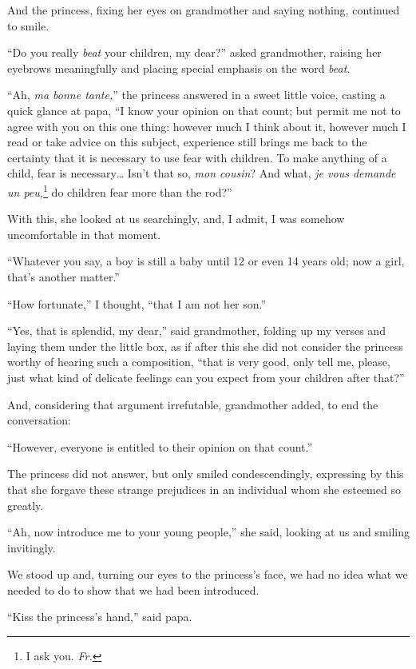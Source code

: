 And the princess, fixing her eyes on grandmother and saying nothing, continued to smile.

``Do you really \textit{beat} your children, my dear?'' asked grandmother, raising her eyebrows meaningfully and placing special emphasis on the word \textit{beat}. %

``Ah, \textit{ma bonne tante,}'' the princess answered in a sweet little voice, casting a quick glance at papa, ``I know your opinion on that count; but permit me not to agree with you on this one thing: however much I think about it, however much I read or take advice on this subject, experience still brings me back to the certainty that it is necessary to use fear with children. To make anything of a child, fear is necessary\ldots{} Isn't that so, \textit{mon cousin}? And what, \textit{je vous demande un peu,}\footnote{I ask you. \textit{Fr.}} do children fear more than the rod?'' %

With this, she looked at us searchingly, and, I admit, I was somehow uncomfortable in that moment.

``Whatever you say, a boy is still a baby until 12 or even 14 years old; now a girl, that's another matter.'' %

``How fortunate,'' I thought, ``that I am not her son.'' %

``Yes, that is splendid, my dear,'' said grandmother, folding up my verses and laying them under the little box, as if after this she did not consider the princess worthy of hearing such a composition, ``that is very good, only tell me, please, just what kind of delicate feelings can you expect from your children after that?'' %

And, considering that argument irrefutable, grandmother added, to end the conversation:

``However, everyone is entitled to their opinion on that count.'' %

The princess did not answer, but only smiled condescendingly, expressing by this that she forgave these strange prejudices in an individual whom she esteemed so greatly.

``Ah, now introduce me to your young people,'' she said, looking at us and smiling invitingly. %

We stood up and, turning our eyes to the princess's face, we had no idea what we needed to do to show that we had been introduced.

``Kiss the princess's hand,'' said papa. %

